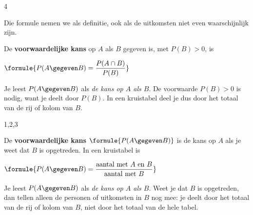 \begin{alleenvoor}{4}

Die formule nemen we als definitie, ook als de uitkomsten niet even waarschijnlijk zijn.

\begin{theorie}
De \textbf{\textcolor{accent}{voorwaardelijke kans}} op $A$ als $B$ gegeven is, met $P(B) > 0$, is

\vspace{1mm}
\qquad $\formule{P(A \gegeven B) = \dfrac{P(A \cap B)}{P(B)}}$
\end{theorie}

Je leest $P(A \gegeven B)$ als \textit{de kans op $A$ als $B$}. De voorwaarde $P(B) > 0$ is nodig, want je deelt door $P(B)$. In een kruistabel deel je dus door het totaal van de rij of kolom van $B$.
\end{alleenvoor}
\begin{alleenvoor}{1,2,3}
\begin{theorie}
De \textbf{\textcolor{accent}{voorwaardelijke kans}} $\formule{P(A \gegeven B)}$ is de kans op $A$ als je weet dat $B$ is opgetreden. In een kruistabel is

\vspace{1mm}
\qquad $\formule{P(A \gegeven B) = \dfrac{\text{aantal met } A \text{ en } B}{\text{aantal met } B}}$
\end{theorie}

Je leest $P(A \gegeven B)$ als \textit{de kans op $A$ als $B$}. Weet je dat $B$ is opgetreden, dan tellen alleen de personen of uitkomsten in $B$ nog mee: je deelt door het totaal van de rij of kolom van $B$, niet door het totaal van de hele tabel.
\end{alleenvoor}

